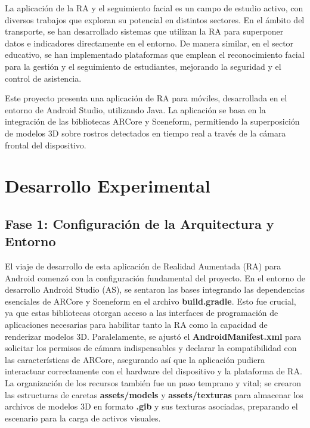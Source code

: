 \documentclass[conference]{IEEEtran}
\begin{document}
    La aplicación de la RA y el seguimiento facial es un campo de estudio activo, con diversos trabajos que exploran su potencial en distintos sectores. En el ámbito del transporte, se han desarrollado sistemas que utilizan la RA para superponer datos e indicadores directamente en el entorno\cite{moctezumaimplementacion}. De manera similar, en el sector educativo, se han implementado plataformas que emplean el reconocimiento facial para la gestión y el seguimiento de estudiantes, mejorando la seguridad y el control de asistencia\cite{castro2022sistema}.

    Este proyecto presenta una aplicación de RA para móviles, desarrollada en el entorno de Android Studio\cite{android_blog,big_nerd_ranch}, utilizando Java. La aplicación se basa en la integración de las bibliotecas ARCore\cite{ar_core} y Sceneform\cite{sceneform}, permitiendo la superposición de modelos 3D sobre rostros detectados en tiempo real a través de la cámara frontal del dispositivo\cite{android_studio,base_proyecto}.
    
\section{Desarrollo Experimental} 

    \subsection{Fase 1: Configuración de la Arquitectura y Entorno}

        El viaje de desarrollo de esta aplicación de Realidad Aumentada (RA) para Android comenzó con la configuración fundamental del proyecto. En el entorno de desarrollo Android Studio (AS), se sentaron las bases integrando las dependencias esenciales de ARCore y Sceneform en el archivo \textbf{build.gradle}. Esto fue crucial, ya que estas bibliotecas otorgan acceso a las interfaces de programación de aplicaciones necesarias para habilitar tanto la RA como la capacidad de renderizar modelos 3D. Paralelamente, se ajustó el \textbf{AndroidManifest.xml} para solicitar los permisos de cámara indispensables y declarar la compatibilidad con las características de ARCore, asegurando así que la aplicación pudiera interactuar correctamente con el hardware del dispositivo y la plataforma de RA. La organización de los recursos también fue un paso temprano y vital; se crearon las estructuras de caretas \textbf{assets/models} y \textbf{assets/texturas} para almacenar los archivos de modelos 3D en formato \textbf{.gib} y sus texturas asociadas, preparando el escenario para la carga de activos visuales.
\end{document}
